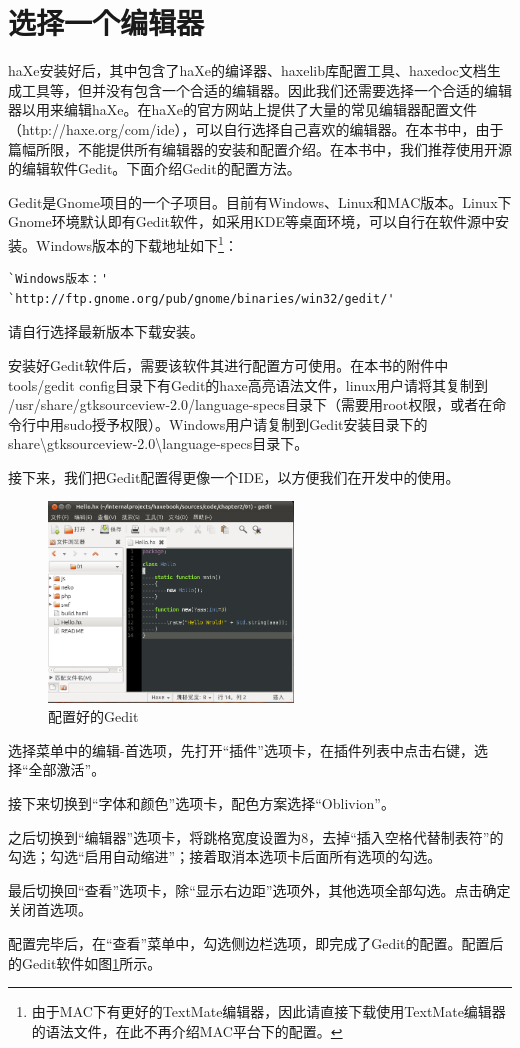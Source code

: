 \section{选择一个编辑器}

haXe安装好后，其中包含了haXe的编译器、haxelib库配置工具、haxedoc文档生成工具等，但并没有包含一个合适的编辑器。因此我们还需要选择一个合适的编辑器以用来编辑haXe。在haXe的官方网站上提供了大量的常见编辑器配置文件（http://haxe.org/com/ide），可以自行选择自己喜欢的编辑器。在本书中，由于篇幅所限，不能提供所有编辑器的安装和配置介绍。在本书中，我们推荐使用开源的编辑软件Gedit。下面介绍Gedit的配置方法。

Gedit是Gnome项目的一个子项目。目前有Windows、Linux和MAC版本。Linux下Gnome环境默认即有Gedit软件，如采用KDE等桌面环境，可以自行在软件源中安装。Windows版本的下载地址如下\footnote{由于MAC下有更好的TextMate编辑器，因此请直接下载使用TextMate编辑器的语法文件，在此不再介绍MAC平台下的配置。}：

\begin{lstlisting}
`Windows版本：'
`http://ftp.gnome.org/pub/gnome/binaries/win32/gedit/'
\end{lstlisting}

请自行选择最新版本下载安装。

安装好Gedit软件后，需要该软件其进行配置方可使用。在本书的附件中tools/gedit config目录下有Gedit的haxe高亮语法文件，linux用户请将其复制到 /usr/share/gtksourceview-2.0/language-specs目录下（需要用root权限，或者在命令行中用sudo授予权限）。Windows用户请复制到Gedit安装目录下的share{\textbackslash}gtksourceview-2.0{\textbackslash}language-specs目录下。

接下来，我们把Gedit配置得更像一个IDE，以方便我们在开发中的使用。

\begin{figure}
\label{configedgedit}
\centering
\includegraphics[width=6.5cm]{images/0001}
\caption{配置好的Gedit}
\end{figure}

选择菜单中的编辑-首选项，先打开“插件”选项卡，在插件列表中点击右键，选择“全部激活”。

接下来切换到“字体和颜色”选项卡，配色方案选择“Oblivion”。

之后切换到“编辑器”选项卡，将跳格宽度设置为8，去掉“插入空格代替制表符”的勾选；勾选“启用自动缩进”；接着取消本选项卡后面所有选项的勾选。

最后切换回“查看”选项卡，除“显示右边距”选项外，其他选项全部勾选。点击确定关闭首选项。

配置完毕后，在“查看”菜单中，勾选侧边栏选项，即完成了Gedit的配置。配置后的Gedit软件如图{\ref{configedgedit}}所示。

